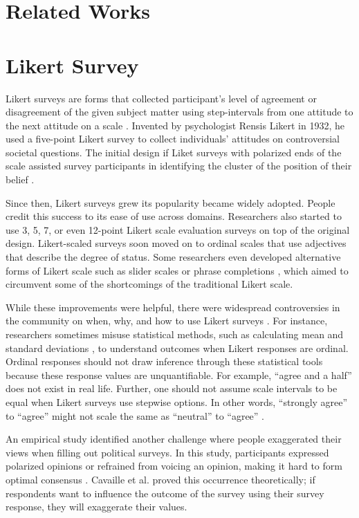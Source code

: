\section{Related Works} \label{related_works}

\section{Likert Survey}
Likert surveys are forms that collected participant's level of agreement or disagreement of the given subject matter using step-intervals from one attitude to the next attitude on a scale \cite{likert1932technique}. Invented by psychologist Rensis Likert in 1932, he used a five-point Likert survey to collect individuals' attitudes on controversial societal questions. The initial design if Liket surveys with polarized ends of the scale assisted survey participants in identifying the cluster of the position of their belief \cite{joshi2015likert}. 

Since then, Likert surveys grew its popularity became widely adopted. People credit this success to its ease of use across domains. Researchers also started to use 3, 5, 7, or even 12-point Likert scale evaluation surveys \cite{garland2008computer,finstad2010} on top of the original design. Likert-scaled surveys soon moved on to ordinal scales that use adjectives that describe the degree of status. Some researchers even developed alternative forms of Likert scale such as slider scales \cite{roster2015exploring} or phrase completions \cite{hodge2003phrase}, which aimed to circumvent some of the shortcomings of the traditional Likert scale.

While these improvements were helpful, there were widespread controversies in the community on when, why, and how to use Likert surveys \cite{bishop2015use}. For instance, researchers sometimes misuse statistical methods, such as calculating mean and standard deviations \cite{jamieson2004likert}, to understand outcomes when Likert responses are ordinal. Ordinal responses should not draw inference through these statistical tools because these response values are unquantifiable. For example, ``agree and a half'' does not exist in real life. Further, one should not assume scale intervals to be equal when Likert surveys use stepwise options. In other words, ``strongly agree'' to ``agree'' might not scale the same as ``neutral'' to ``agree'' \cite{jamieson2004likert, edmondson2005likert}.

An empirical study \cite{quarfoot2017quadratic} identified another challenge where people exaggerated their views when filling out political surveys. In this study, participants expressed polarized opinions or refrained from voicing an opinion, making it hard to form optimal consensus \cite{posner2018radical}. Cavaille et al. \cite{cavaille2018towards}  proved this occurrence theoretically; if respondents want to influence the outcome of the survey using their survey response, they will exaggerate their values.

